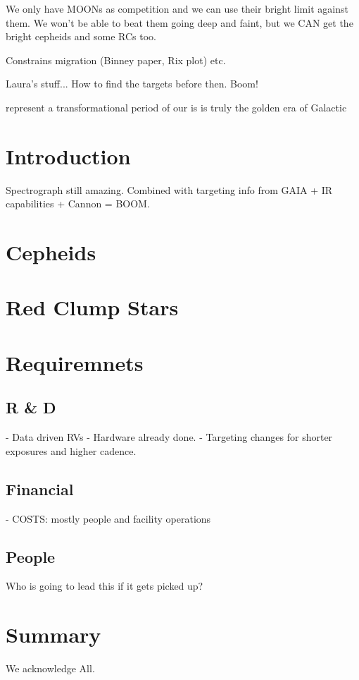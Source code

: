 \documentclass[11pt,preprint]{aastex}
\begin{document}
We only have MOONs as competition and we can use their bright limit  against them. We won't be able to beat them going deep and faint, but we CAN get the bright cepheids and some RCs too.

Constrains migration (Binney paper, Rix plot)  etc.


Laura's stuff... How to  find the targets before then. Boom!




represent a transformational period of our is is truly the golden era of Galactic
\section{Introduction}
\label{sec:intro}
Spectrograph still amazing. Combined with targeting info from GAIA + IR capabilities + Cannon = BOOM. 

\section{Cepheids}
\label{sec:cepheids}

\section{Red Clump Stars}
\label{sec:rcs}

\section{Requiremnets}
\label{sec:results}
\subsection{R \& D}
- Data driven RVs
- Hardware already done. 
- Targeting changes for shorter exposures and higher cadence.

\subsection{Financial}
- COSTS: mostly people and facility operations

\subsection{People}
Who is going to lead this if it gets picked up?

\section{Summary}
\label{sec:summary}

\acknowledgements
We acknowledge All.

%
%
%
\end{document}
